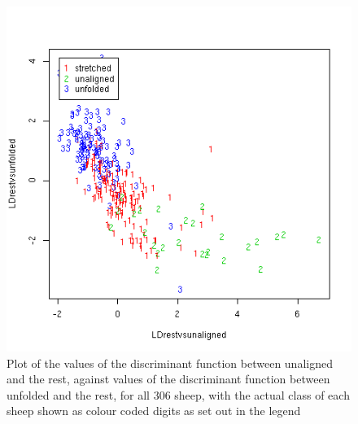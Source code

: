 %

\begin{figure}[!h]
  \centering
  \includegraphics[width=1.1\textwidth]{figldunal_ldunf.png}
  \caption{Plot of the values of the discriminant function between unaligned and the rest, against values of the discriminant function between unfolded and the rest, for all 306 sheep, with the actual class of each sheep shown as colour coded digits as set out in the legend}
  \label{fig:ldunal_ldunf}
\end{figure}

%


